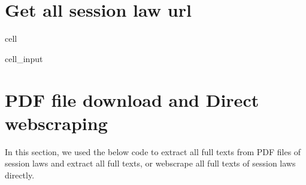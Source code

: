 \documentclass[letterpaper,10pt,english]{jupyterBook}
\begin{document}
\section{Get all session law url}
\label{\detokenize{ch40:get-all-session-law-url}}
\begin{sphinxuseclass}{cell}\begin{sphinxVerbatimInput}

\begin{sphinxuseclass}{cell_input}
\begin{sphinxVerbatim}[commandchars=\\\{\}]
  

   

  
   
      

  

\end{sphinxVerbatim}

\end{sphinxuseclass}\end{sphinxVerbatimInput}

\end{sphinxuseclass}

\section{PDF file download and Direct webscraping}
\label{\detokenize{ch40:pdf-file-download-and-direct-webscraping}}
\sphinxAtStartPar
In this section, we used the below code to extract all full texts from PDF files of session laws and extract all full texts, or webscrape all full texts of session laws directly.
\end{document}
